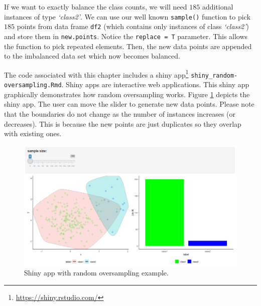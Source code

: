 \documentclass[
  11pt,
]{krantz}
\newenvironment{Shaded}{\begin{snugshade}}{\end{snugshade}}
\newcommand{\AttributeTok}[1]{\textcolor[rgb]{0.61,0.61,0.61}{#1}}
\newcommand{\CommentTok}[1]{\textcolor[rgb]{0.37,0.37,0.37}{\textit{#1}}}
\newcommand{\DecValTok}[1]{\textcolor[rgb]{0.06,0.06,0.06}{#1}}
\newcommand{\FunctionTok}[1]{\textcolor[rgb]{0,0,0}{#1}}
\newcommand{\NormalTok}[1]{#1}
\newcommand{\OtherTok}[1]{\textcolor[rgb]{0.37,0.37,0.37}{#1}}
\newcommand{\SpecialCharTok}[1]{\textcolor[rgb]{0,0,0}{#1}}
\begin{document}
If we want to exactly balance the class counts, we will need \(185\) additional instances of type \emph{`class2'}. We can use our well known \texttt{sample()} function to pick \(185\) points from data frame \texttt{df2} (which contains only instances of class \emph{`class2'}) and store them in \texttt{new.points}. Notice the \texttt{replace\ =\ T} parameter. This allows the function to pick repeated elements. Then, the new data points are appended to the imbalanced data set which now becomes balanced.

\begin{Shaded}
\end{Shaded}

The code associated with this chapter includes a shiny app\footnote{\url{https://shiny.rstudio.com/}} \texttt{shiny\_random-oversampling.Rmd}. Shiny apps are interactive web applications. This shiny app graphically demonstrates how random oversampling works. Figure \ref{fig:shinyOversampling} depicts the shiny app. The user can move the slider to generate new data points. Please note that the boundaries do not change as the number of instances increases (or decreases). This is because the new points are just duplicates so they overlap with existing ones.

\begin{figure}

{\centering \includegraphics[width=1\linewidth]{images/shiny_oversampling} 

}

\caption{Shiny app with random oversampling example.}\label{fig:shinyOversampling}
\end{figure}
\end{document}
